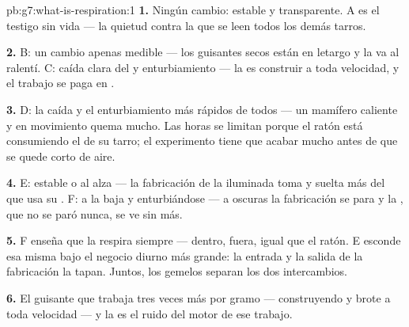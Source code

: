 \begin{solution}{pb:g7:what-is-respiration:1}
\textbf{1.} Ningún cambio:  estable y  transparente.
A es el testigo sin vida --- la quietud contra la que se leen todos los
demás tarros.

\textbf{2.} B: un cambio apenas medible --- los guisantes secos están
en letargo y la  va al ralentí. C: caída clara del  y
enturbiamiento --- la  es construir a toda velocidad, y el
trabajo se paga en .

\textbf{3.} D: la caída y el enturbiamiento más rápidos de todos --- un
mamífero caliente y en movimiento quema mucho. Las horas se limitan
porque el ratón está consumiendo el  de su tarro; el experimento
tiene que acabar mucho antes de que se quede corto de aire.

\textbf{4.} E:  estable o al alza --- la fabricación de la
 iluminada toma  y suelta más  del que
usa su . F:  a la baja y  enturbiándose
--- a oscuras la fabricación se para y la , que no se paró
nunca, se ve sin más.

\textbf{5.} F enseña que la  respira siempre ---  dentro,
 fuera, igual que el ratón. E esconde esa misma
 bajo el negocio diurno más grande: la entrada y la salida
de la fabricación la tapan. Juntos, los gemelos separan los dos
intercambios.

\textbf{6.} El guisante que  trabaja tres veces más por gramo
--- construyendo  y brote a toda velocidad --- y la 
es el ruido del motor de ese trabajo.


\end{solution}
